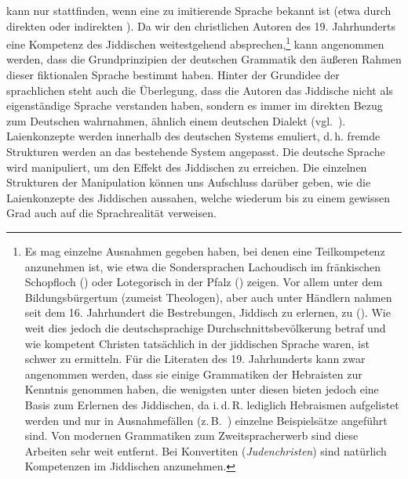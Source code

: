  kann nur stattfinden, wenn eine zu imitierende Sprache bekannt ist (etwa durch direkten oder indirekten ). Da wir den christlichen Autoren des 19. Jahrhunderts eine Kompetenz des Jiddischen weitestgehend absprechen,\footnote{Es mag einzelne Ausnahmen gegeben haben, bei denen eine Teilkompetenz anzunehmen ist, wie etwa die Sondersprachen Lachoudisch im fränkischen Schopfloch (\citealt{Hofmann1998,Klepsch1996,Klepsch2004,Klepsch2008,Matras1996,Philipp1983}) oder Lotegorisch in der Pfalz (\citealt{Meissner1999}) zeigen. Vor allem unter dem Bildungsbürgertum (zumeist Theologen), aber auch unter Händlern nahmen seit dem 16. Jahrhundert die Bestrebungen, Jiddisch zu erlernen, zu (\citealt{Elyada2012}). Wie weit dies jedoch die deutschsprachige Durchschnittsbevölkerung betraf und wie kompetent Christen tatsächlich in der jiddischen Sprache waren, ist schwer zu ermitteln. Für die Literaten des 19. Jahrhunderts kann zwar angenommen werden, dass sie einige Grammatiken der Hebraisten zur Kenntnis genommen haben, die wenigsten unter diesen bieten jedoch eine Basis zum Erlernen des Jiddischen, da i.\,d.\,R. lediglich Hebraismen aufgelistet werden und nur in Ausnahmefällen (z.\,B.\, \citealt{Haselbauer1742,Friedrich1784}) einzelne Beispielsätze angeführt sind. Von modernen Grammatiken zum Zweitspracherwerb sind diese Arbeiten sehr weit entfernt. Bei Konvertiten (\textit{Judenchristen}) sind natürlich Kompetenzen im Jiddischen anzunehmen.} kann angenommen werden, dass die Grundprinzipien der deutschen Grammatik den äußeren Rahmen dieser fiktionalen Sprache bestimmt haben. Hinter der Grundidee der sprachlichen  steht auch die Überlegung, dass die Autoren das Jiddische nicht als eigenständige Sprache verstanden haben, sondern es immer im direkten Bezug zum Deutschen wahrnahmen, ähnlich einem deutschen Dialekt (vgl.\, \citealt[127–136]{Elyada2012}). Laienkonzepte werden innerhalb des deutschen Systems emuliert, d.\,h. fremde Strukturen werden an das bestehende System angepasst. Die deutsche Sprache wird manipuliert, um den Effekt des Jiddischen zu erreichen. Die einzelnen Strukturen der Manipulation können uns Aufschluss darüber geben, wie die Laienkonzepte des Jiddischen aussahen, welche wiederum bis zu einem gewissen Grad auch auf die Sprachrealität verweisen.  

